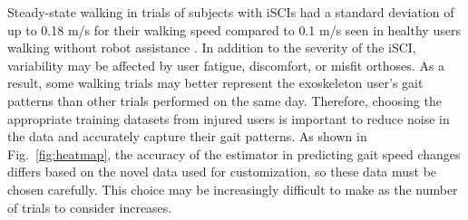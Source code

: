 Steady-state walking in trials of subjects with iSCIs had a standard deviation of up to 0.18 m/s for their walking speed compared to 0.1 m/s seen in healthy users walking without robot assistance \cite{socie2013gait}. In addition to the severity of the iSCI, variability may be affected by user fatigue, discomfort, or misfit orthoses. As a result, some walking trials may better represent the exoskeleton user's gait patterns than other trials performed on the same day. Therefore, choosing the appropriate training datasets from injured users is important to reduce noise in the data and accurately capture their gait patterns. As shown in Fig.~\ref{fig:heatmap}, the accuracy of the estimator in predicting gait speed changes differs based on the novel data used for customization, so these data must be chosen carefully. This choice may be increasingly difficult to make as the number of trials to consider increases. 

